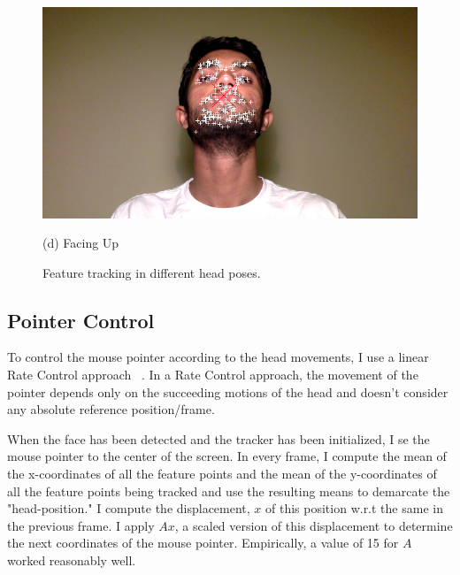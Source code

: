 \begin{figure}[htbp]
	\begin{minipage}[t]{0.49\textwidth}\centering\includegraphics[width=\linewidth]{pics/upTracking.png}\par(d)  Facing Up \end{minipage}
	\caption{Feature tracking in different head poses.}
	\label{fig:tracking}
\end{figure}



\subsection{Pointer Control}

To control the mouse pointer according to the head movements, I use a linear Rate Control approach ~\cite{kjeldsen2006improvements}. In a Rate Control approach, the movement of the pointer depends only on the succeeding motions of the head and doesn't consider any absolute reference position/frame.

When the face has been detected and the tracker has been initialized, I se the mouse pointer to the center of the screen. In every frame, I compute the mean of the x-coordinates of all the feature points and the mean of the y-coordinates of all the feature points being tracked and use the resulting means to demarcate the "head-position." I compute the displacement, $x$ of this position w.r.t the same in the previous frame. I apply $Ax$, a scaled version of this displacement to determine the next coordinates of the mouse pointer. Empirically, a value of 15 for $A$ worked reasonably well.
